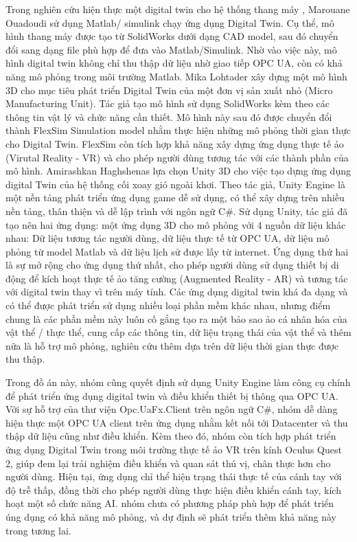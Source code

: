 Trong nghiên cứu hiện thực một digital twin cho hệ thống thang máy \cite{elevator}, Marouane Ouadoudi sử dụng Matlab/ simulink chạy ứng dụng Digital Twin. Cụ thể, mô hình thang máy được tạo từ SolidWorks dưới dạng CAD model, sau đó chuyển đổi sang dạng file phù hợp để đưa vào Matlab/Simulink. Nhờ vào việc này, mô hình digital twin không chỉ thu thập dữ liệu nhờ giao tiếp OPC UA, còn có khả năng mô phỏng trong môi trường Matlab. Mika Lohtader \cite{lohtander2018micro} xây dựng một mô hình 3D cho mục tiêu phát triển Digital Twin của một đơn vị sản xuất nhỏ (Micro Manufacturing Unit). Tác giả tạo mô hình sử dụng SolidWorks kèm theo các thông tin vật lý và chức năng cần thiết. Mô hình này sau đó được chuyển đổi thành FlexSim Simulation model nhằm thực hiện những mô phỏng thời gian thực cho Digital Twin. FlexSim còn tích hợp khả năng xây dựng ứng dụng thực tế ảo (Virutal Reality - VR) và cho phép người dùng tương tác với các thành phần của mô hình. Amirashkan Haghshenas \cite{haghshenaspredictivewindstore} lựa chọn Unity 3D cho việc tạo dựng ứng dụng digital Twin của hệ thống cối xoay gió ngoài khơi. Theo tác giả, Unity Engine là một nền tảng phát triển ứng dụng game dễ sử dụng, có thể xây dựng trên nhiều nền tảng, thân thiện và dễ lập trình với ngôn ngữ C\#. Sử dụng Unity, tác giả đã tạo nên hai ứng dụng: một ứng dụng 3D cho mô phỏng với 4 nguồn dữ liệu khác nhau: Dữ liệu tương tác người dùng, dữ liệu thực tế từ OPC UA, dữ liệu mô phỏng từ model Matlab và dữ liệu lịch sử được lấy từ internet. Ứng dụng thứ hai là sự mở rộng cho ứng dụng thứ nhất, cho phép người dùng sử dụng thiết bị di động để kích hoạt thực tế ảo tăng cường (Augmented Reality - AR) và tương tác với digital twin thay vì trên máy tính. Các ứng dụng digital twin khá đa dạng và có thể được phát triển sử dụng nhiều loại phần mềm khác nhau, nhưng điểm chung là các phần mềm này luôn cố gắng tạo ra một bảo sao ảo cá nhân hóa của vật thể / thực thể, cung cấp các thông tin, dữ liệu trạng thái của vật thể và thêm nữa là hỗ trợ mô phỏng, nghiên cứu thêm dựa trên dữ liệu thời gian thực được thu thập. 

Trong đồ án này, nhóm cũng quyết định sử dụng Unity Engine làm công cụ chính để phát triển ứng dụng digital twin và điều khiển thiết bị thông qua OPC UA. Với sự hỗ trợ của thư viện Opc.UaFx.Client trên ngôn ngữ C\#, nhóm dễ dàng hiện thực một OPC UA client trên ứng dụng nhằm kết nối tới Datacenter và thu thập dữ liệu cũng như điều khiển. Kèm theo đó, nhóm còn tích hợp phát triển ứng dụng Digital Twin trong môi trường thực tế ảo VR trên kính Oculus Quest 2, giúp đem lại trải nghiệm điều khiển và quan sát thú vị, chân thực hơn cho người dùng. Hiện tại, ứng dụng chỉ thể hiện trạng thái thực tế của cánh tay với độ trễ thấp, đồng thời cho phép người dùng thực hiện điều khiển cánh tay, kích hoạt một số chức năng AI. nhóm chưa có phương pháp phù hợp để phát triển úng dụng có khả năng mô phỏng, và dự định sẽ phát triển thêm khả năng này trong tương lai. 

